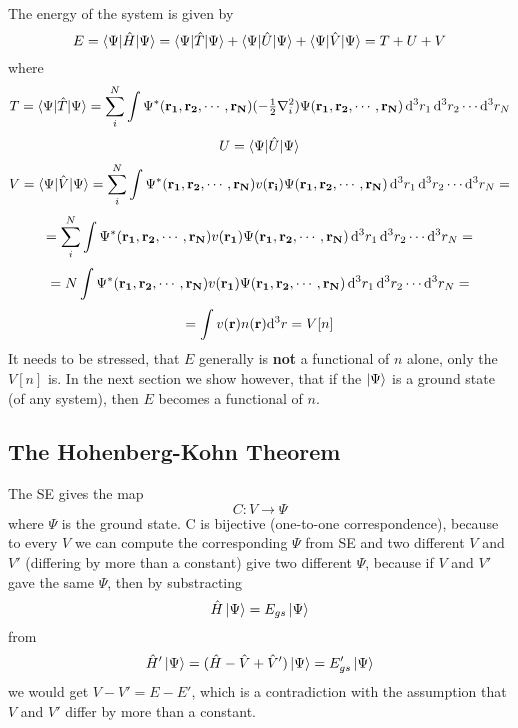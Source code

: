 The energy of the system is given by 
\begin{equation}
  E=\mathinner{\langle{\Psi|\hat H|\Psi}\rangle}= \mathinner{\langle{\Psi|\hat T|\Psi}\rangle}+\mathinner{\langle{\Psi|\hat U|\Psi}\rangle}+\mathinner{\langle{\Psi|\hat V|\Psi}\rangle}= T+U+V  \label{Emanybody}
\end{equation}
where 
\begin{equation*}
  T=\mathinner{\langle{\Psi|\hat T|\Psi}\rangle}=\sum_i^N\int \Psi^*({\bf r_1},{\bf r_2},\cdots,{\bf r_N})(-{\textstyle{1\over2}}\nabla_i^2) \Psi({\bf r_1},{\bf r_2},\cdots,{\bf r_N})\,{\rm d}^3 r_1\,{\rm d}^3 r_2\cdots{\rm d}^3 r_N
\end{equation*}
\begin{equation*}
  U=\mathinner{\langle{\Psi|\hat U|\Psi}\rangle}
\end{equation*}
\begin{equation*}
  V=\mathinner{\langle{\Psi|\hat V|\Psi}\rangle}=\sum_i^N\int \Psi^*({\bf r_1},{\bf r_2},\cdots,{\bf r_N})v({\bf r_i}) \Psi({\bf r_1},{\bf r_2},\cdots,{\bf r_N})\,{\rm d}^3 r_1\,{\rm d}^3 r_2\cdots{\rm d}^3 r_N=
\end{equation*}
\begin{equation*}
  =\sum_i^N\int \Psi^*({\bf r_1},{\bf r_2},\cdots,{\bf r_N})v({\bf r_1}) \Psi({\bf r_1},{\bf r_2},\cdots,{\bf r_N})\,{\rm d}^3 r_1\,{\rm d}^3 r_2\cdots{\rm d}^3 r_N=
\end{equation*}
\begin{equation*}
  =N\int \Psi^*({\bf r_1},{\bf r_2},\cdots,{\bf r_N})v({\bf r_1}) \Psi({\bf r_1},{\bf r_2},\cdots,{\bf r_N})\,{\rm d}^3 r_1\,{\rm d}^3 r_2\cdots{\rm d}^3 r_N=
\end{equation*}
\begin{equation}
  =\int v({\bf r}) n({\bf r}){\rm d}^3 r=V[n]  \label{V[n]}
\end{equation}
It needs to be stressed, that $E$ generally is \textbf{not} a functional of $n$ alone, only the $V[n]$ is. In the next section we show however, that if the $\mathinner{|{\Psi}\rangle}$ is a ground state (of any system), then $E$ becomes a functional of $n$.

\subsection{The Hohenberg-Kohn Theorem}

The SE gives the map 
\begin{equation*}
  C: V \to \Psi
\end{equation*}
where $\Psi$ is the ground state. C is bijective (one-to-one correspondence), because to every $V$ we can compute the corresponding $\Psi$ from SE and two different $V$ and $V'$ (differing by more than a constant) give two different $\Psi$, because if $V$ and $V'$ gave the same $\Psi$, then by substracting 
\begin{equation*}
  \hat H\mathinner{|{\Psi}\rangle}=E_{gs}\mathinner{|{\Psi}\rangle}
\end{equation*}
from 
\begin{equation*}
  \hat H'\mathinner{|{\Psi}\rangle}=(\hat H-\hat V+\hat V')\mathinner{|{\Psi}\rangle}=E_{gs}'\mathinner{|{\Psi}\rangle}
\end{equation*}
we would get $V-V'=E-E'$, which is a contradiction with the assumption that $V$ and $V'$ differ by more than a constant.

